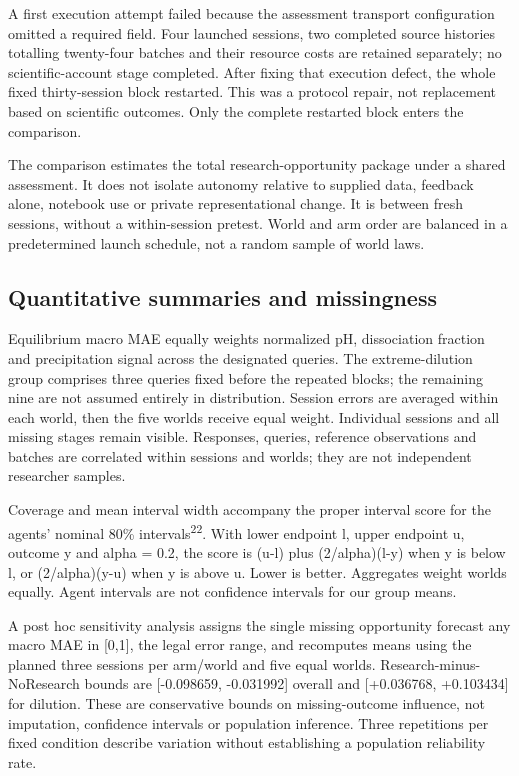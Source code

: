 \documentclass[10pt,a4paper]{article}
\begin{document}
A first execution attempt failed because the assessment transport configuration omitted a required field. Four launched sessions, two completed source histories totalling twenty-four batches and their resource costs are retained separately; no scientific-account stage completed. After fixing that execution defect, the whole fixed thirty-session block restarted. This was a protocol repair, not replacement based on scientific outcomes. Only the complete restarted block enters the comparison.

The comparison estimates the total research-opportunity package under a shared assessment. It does not isolate autonomy relative to supplied data, feedback alone, notebook use or private representational change. It is between fresh sessions, without a within-session pretest. World and arm order are balanced in a predetermined launch schedule, not a random sample of world laws.

\subsection{Quantitative summaries and missingness}\label{quantitative-summaries-and-missingness}

Equilibrium macro MAE equally weights normalized pH, dissociation fraction and precipitation signal across the designated queries. The extreme-dilution group comprises three queries fixed before the repeated blocks; the remaining nine are not assumed entirely in distribution. Session errors are averaged within each world, then the five worlds receive equal weight. Individual sessions and all missing stages remain visible. Responses, queries, reference observations and batches are correlated within sessions and worlds; they are not independent researcher samples.

Coverage and mean interval width accompany the proper interval score for the agents' nominal 80\% intervals\textsuperscript{22}. With lower endpoint l, upper endpoint u, outcome y and alpha = 0.2, the score is (u-l) plus (2/alpha)(l-y) when y is below l, or (2/alpha)(y-u) when y is above u. Lower is better. Aggregates weight worlds equally. Agent intervals are not confidence intervals for our group means.

A post hoc sensitivity analysis assigns the single missing opportunity forecast any macro MAE in {[}0,1{]}, the legal error range, and recomputes means using the planned three sessions per arm/world and five equal worlds. Research-minus-NoResearch bounds are {[}-0.098659, -0.031992{]} overall and {[}+0.036768, +0.103434{]} for dilution. These are conservative bounds on missing-outcome influence, not imputation, confidence intervals or population inference. Three repetitions per fixed condition describe variation without establishing a population reliability rate.
\end{document}
